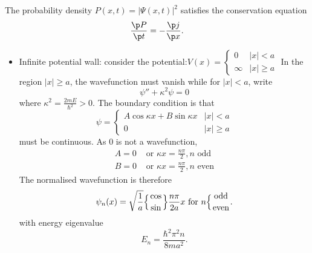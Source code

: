 \documentclass[a4paper]{article}
\theoremstyle{definition}
\begin{document}
\begin{prop}
  The probability density \(P(x,t) = |\Psi(x,t)|^2\) satisfies the conservation equation
  \[
    \frac{\p P}{\p t} = - \frac{\p j}{\p x}.
  \]
\end{prop}

\begin{eg}\leavevmode
\begin{itemize}
\item Infinite potential wall: consider the potential:\(V(x)=
  \begin{cases}
    0 & |x| < a \\
    \infty & |x| \geq a
  \end{cases}
  \) In the region \(|x| \geq a\), the wavefunction must vanish while for \(|x| < a\), write
  \[
\psi'' + \kappa^2 \psi =0
\]
where \(\kappa^2=\frac{2mE}{\hbar^2} > 0\). The boundary condition is that
\[
  \psi =
  \begin{cases}
    A\cos \kappa x + B\sin \kappa x & |x| < a \\
    0 & |x| \geq a
  \end{cases}
\]
must be continuous. As \(0\) is not a wavefunction,
\begin{align*}
  A=0 &\text{ or } \kappa x = \frac{n\pi}{2}, n \text{ odd} \\
  B=0 &\text{ or } \kappa x = \frac{n\pi}{2}, n \text{ even}
\end{align*}
The normalised wavefunction is therefore
\[
\psi_n(x) = \sqrt \frac{1}{a} \Big\{ {\cos \atop \sin} \Big\} \frac{n\pi}{2a} x \text{ for } n \Big\{ {\text{odd} \atop \text{even}}.
\]
with energy eigenvalue
\[
E_n = \frac{\hbar^2\pi^2n}{8ma^2}.
\]


\end{itemize}
\end{eg}
\end{document}
